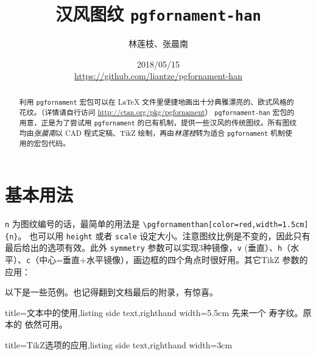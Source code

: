 \documentclass[fontset=fandol]{ctexart}
\title{汉风图纹 \texttt{pgfornament-han}}
\author{林莲枝、张晨南}
\date{2018/05/15\\\url{https://github.com/liantze/pgfornament-han}}
\newcommand{\latexinline}[1]{\lstinline|#1|}
\begin{document}
\maketitle

\begin{abstract}
利用 \texttt{pgfornament} 宏包可以在 \LaTeX{} 文件里便捷地画出十分典雅漂亮的、欧式风格的花纹。（详情请自行访问 \url{http://ctan.org/pkg/pgfornament}）
 \texttt{pgfornament-han} 宏包的用意，正是为了尝试用 \texttt{pgfornament} 的已有机制，提供一些汉风的传统图纹。所有图纹均由\emph{张晨南}以 CAD 程式定稿、TikZ 绘制，再由\emph{林莲枝}转为适合 \texttt{pgfornament} 机制使用的宏包代码。
\end{abstract}

\part{基本用法}

\texttt{n} 为图纹编号的话，最简单的用法是 \latexinline{\pgfornamenthan[color=red,width=1.5cm]{n}}。
也可以用 \texttt{height} 或者 \texttt{scale} 设定大小。注意图纹比例是不变的，因此只有最后给出的选项有效。此外 \texttt{symmetry} 参数可以实现3种镜像，\texttt{v} (垂直）、\texttt{h}（水平）、\texttt{c}（中心=垂直+水平镜像），画边框的四个角点时很好用。其它TikZ 参数的应用：

\begin{latexcode}
\end{latexcode}

以下是一些范例。也记得翻到文档最后的附录，有惊喜。

\bigskip

\begin{tcblisting}{title={文本中的使用},listing side text,righthand width=5.5cm}
先来一个 
寿字纹。原本的  依然可用。
\end{tcblisting}

\enlargethispage{\baselineskip}


\begin{tcblisting}{title={TikZ选项的应用},listing side text,righthand width=3cm}
\end{tcblisting}
\end{document}
